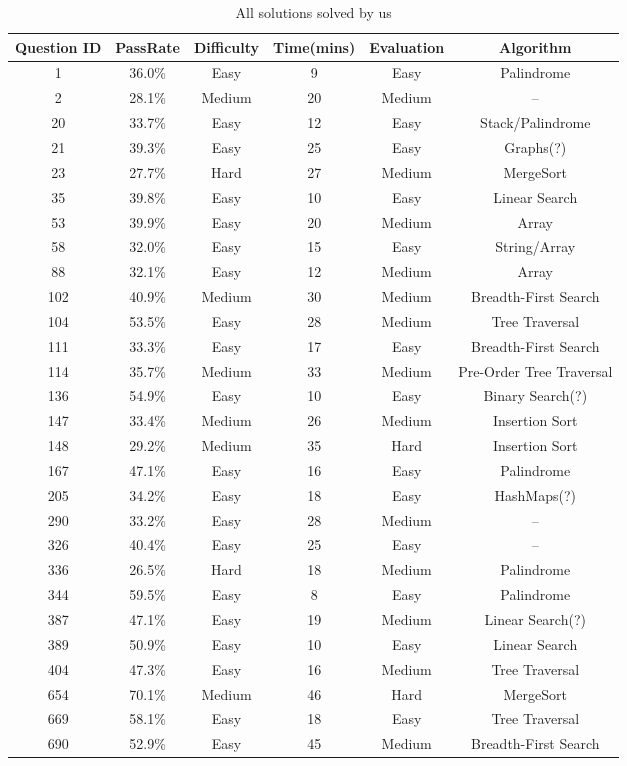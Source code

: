 \documentclass[10pt,twocolumn]{IEEEtran}
\begin{document}
\begin{table}[t]
 \begin{tabular}{|c| c| c| c| c| c|} \hline
 Question ID & PassRate & Difficulty & Time(mins) &Evaluation &Algorithm \\
	 \hline
 	1 & 36.0\% & Easy & 9 & Easy & Palindrome\\ 
 	\hline
	 2 & 28.1\% & Medium & 20 &Medium& -- \\
 	\hline
	 20 & 33.7\% & Easy & 12&Easy& Stack/Palindrome \\
 	\hline
 	21 & 39.3\% & Easy & 25&Easy& Graphs(?) \\
 	\hline
 	23 & 27.7\% & Hard & 27&Medium&MergeSort \\
  	\hline
 	35 &39.8\%  & Easy & 10 &Easy&Linear Search\\
  	\hline
 	53 &39.9\%  & Easy & 20 &Medium&Array\\
  	\hline
 	58 & 32.0\% & Easy & 15 &Easy&String/Array\\
  	\hline
 	88 & 32.1\% & Easy & 12 &Medium&Array\\
  	\hline
 	102 & 40.9\% &  Medium & 30  &Medium & Breadth-First Search\\
  	\hline
	104 & 53.5\% &Easy  &28  &Medium& Tree Traversal\\
  	\hline
 	111 &  33.3\%& Easy&17  &Easy& Breadth-First Search\\
  	\hline
 	114 & 35.7\% &Medium  & 33  &Medium& Pre-Order Tree Traversal\\
  	\hline
 	136 &54.9\%  &Easy  &10  &Easy&Binary Search(?)\\
  	\hline
 	147 & 33.4\% &Medium  &26  &Medium&Insertion Sort\\
  	\hline
 	148 &  29.2\%& Medium & 35 &Hard&Insertion Sort\\
  	\hline
  	167 & 47.1\% &Easy  &16  &Easy&Palindrome\\
  	\hline
  	205 & 34.2\% &Easy  &18  &Easy&HashMaps(?)\\
  	\hline
 	290 & 33.2\% &Easy  &28  &Medium&--\\
  	\hline
 	326 & 40.4\% &Easy  &25  &Easy&--\\
   	\hline
  	336 & 26.5\% &Hard &18  &Medium&Palindrome\\
  	\hline
 	344 & 59.5\% &Easy  &8  &Easy&Palindrome\\
  	\hline
 	387 & 47.1\% &Easy  & 19 &Medium&Linear Search(?)\\
  	\hline
 	389 & 50.9\% &Easy  & 10 &Easy&Linear Search\\
  	\hline
 	404 & 47.3\% &Easy  &16  &Medium&Tree Traversal\\
  	\hline
 	654 & 70.1\% &Medium  &46  &Hard&MergeSort\\
  	\hline
	669 &  58.1\%& Easy &18  &Easy&Tree Traversal\\
  	\hline
 	690 &  52.9\%& Easy &   45&Medium&Breadth-First Search\\[1ex]
 	\hline
\end{tabular}
\caption{All solutions solved by us}
\label{tab:tabSols}
\end{table}
\end{document}
